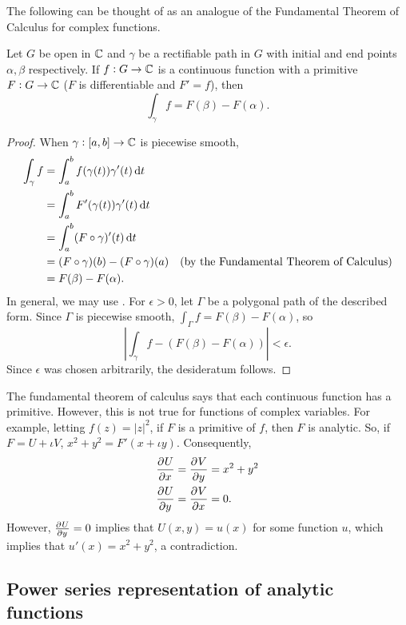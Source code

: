 	The following can be thought of as an analogue of the Fundamental Theorem of Calculus for complex functions.

	\begin{ftheo}
		Let $G$ be open in $\mathbb{C}$ and $\gamma$ be a rectifiable path in $G$ with initial and end points $\alpha,\beta$ respectively. If $f : G \to \mathbb{C}$ is a continuous function with a primitive $F : G \to \mathbb{C}$ ($F$ is differentiable and $F' = f$), then
		\[ \int_\gamma f = F(\beta) - F(\alpha). \]
	\end{ftheo}
	\begin{proof}
		When $\gamma : [a,b] \to \mathbb{C}$ is piecewise smooth,
		\begin{align*}
			\int_\gamma f &= \int_a^b f(\gamma(t)) \gamma'(t) \dif t \\
				&= \int_a^b F'(\gamma(t)) \gamma'(t) \dif t \\
				&= \int_a^b (F \circ \gamma)'(t) \dif t \\
				&= (F \circ \gamma) (b) - (F \circ \gamma) (a) & \text{(by the Fundamental Theorem of Calculus)} \\
				&= F(\beta) - F(\alpha).
		\end{align*}
		In general, we may use . For $\epsilon > 0$, let $\Gamma$ be a polygonal path of the described form. Since $\Gamma$ is piecewise smooth, $\int_\Gamma f = F(\beta) - F(\alpha)$, so
		\[ \left| \int_\gamma f - (F(\beta) - F(\alpha)) \right| < \epsilon. \]
		Since $\epsilon$ was chosen arbitrarily, the desideratum follows.
	\end{proof}

	The fundamental theorem of calculus says that each continuous function has a primitive. However, this is not true for functions of complex variables. For example, letting $f(z) = |z|^2$, if $F$ is a primitive of $f$, then $F$ is analytic. So, if $F = U + \iota V$, $x^2 + y^2 = F'(x+\iota y)$. Consequently,
	\begin{align*}
		\dpd{U}{x} &= \dpd{V}{y} = x^2 + y^2 \\
		\dpd{U}{y} &= \dpd{V}{x} = 0.
	\end{align*}
	However, $\pd{U}{y} = 0$ implies that $U(x,y) = u(x)$ for some function $u$, which implies that $u'(x) = x^2 + y^2$, a contradiction.

\subsection{Power series representation of analytic functions}

